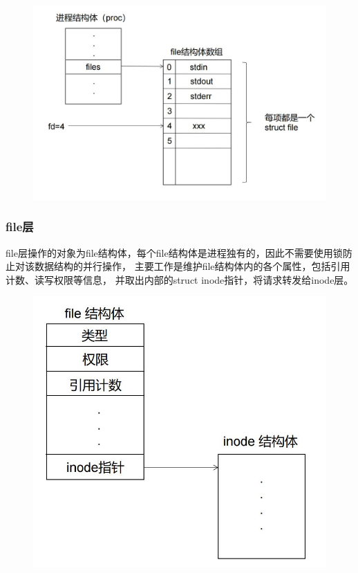\documentclass[UTF8,a4paper,10pt]{ctexart}
\begin{document}
  \begin{figure}[H]
    \centering
    \includegraphics[scale=0.5]{image/file02.jpg}
  \end{figure}

\subsubsection{file层}

file层操作的对象为file结构体，每个file结构体是进程独有的，因此不需要使用锁防止对该数据结构的并行操作，
主要工作是维护file结构体内的各个属性，包括引用计数、读写权限等信息，
并取出内部的struct inode指针，将请求转发给inode层。

\begin{figure}[H]
  \centering
  \includegraphics[scale=0.5]{image/file03.jpg}
\end{figure}
\end{document}
